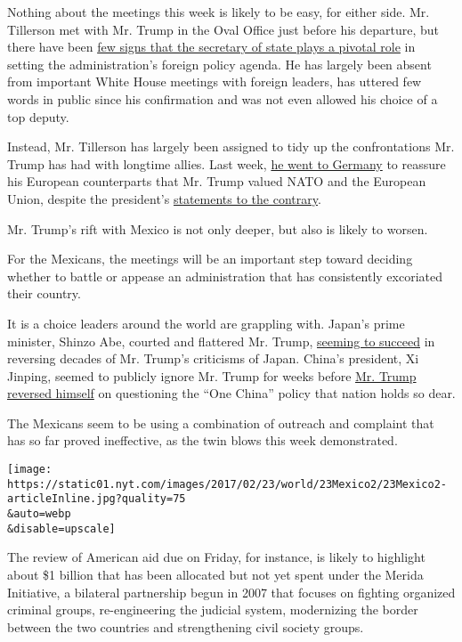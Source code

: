 Nothing about the meetings this week is likely to be easy, for either
side. Mr. Tillerson met with Mr. Trump in the Oval Office just before
his departure, but there have been
\href{https://www.nytimes.com/2017/02/15/world/europe/germany-rex-tillerson.html}{few
signs that the secretary of state plays a pivotal role} in setting the
administration's foreign policy agenda. He has largely been absent from
important White House meetings with foreign leaders, has uttered few
words in public since his confirmation and was not even allowed his
choice of a top deputy.

Instead, Mr. Tillerson has largely been assigned to tidy up the
confrontations Mr. Trump has had with longtime allies. Last week,
\href{https://www.nytimes.com/2017/02/15/world/europe/jim-mattis-nato-trump.html}{he
went to Germany} to reassure his European counterparts that Mr. Trump
valued NATO and the European Union, despite the president's
\href{https://www.nytimes.com/2017/01/15/world/europe/donald-trump-nato.html}{statements
to the contrary}.

Mr. Trump's rift with Mexico is not only deeper, but also is likely to
worsen.

For the Mexicans, the meetings will be an important step toward deciding
whether to battle or appease an administration that has consistently
excoriated their country.

It is a choice leaders around the world are grappling with. Japan's
prime minister, Shinzo Abe, courted and flattered Mr. Trump,
\href{https://www.nytimes.com/2017/02/13/world/asia/trump-japan-shinzo-abe.html}{seeming
to succeed} in reversing decades of Mr. Trump's criticisms of Japan.
China's president, Xi Jinping, seemed to publicly ignore Mr. Trump for
weeks before
\href{https://www.nytimes.com/2017/02/09/world/asia/donald-trump-china-xi-jinping-letter.html}{Mr.
Trump reversed himself} on questioning the ``One China'' policy that
nation holds so dear.

The Mexicans seem to be using a combination of outreach and complaint
that has so far proved ineffective, as the twin blows this week
demonstrated.

\texttt{[image: https://static01.nyt.com/images/2017/02/23/world/23Mexico2/23Mexico2-articleInline.jpg?quality=75\\\&auto=webp\\\&disable=upscale]}

The review of American aid due on Friday, for instance, is likely to
highlight about \$1 billion that has been allocated but not yet spent
under the Merida Initiative, a bilateral partnership begun in 2007 that
focuses on fighting organized criminal groups, re-engineering the
judicial system, modernizing the border between the two countries and
strengthening civil society groups.

